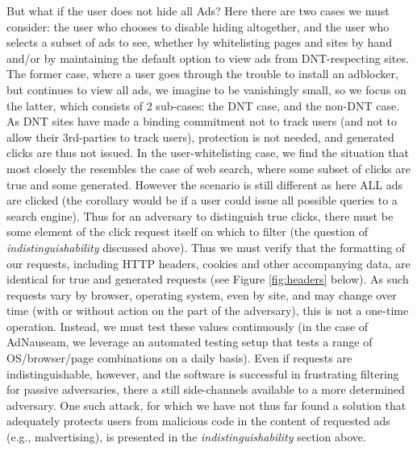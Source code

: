 \documentclass[conference]{IEEEtran}
\begin{document}
But what if the user does not hide all Ads? Here there are two cases we must consider: the user who chooses to disable hiding altogether, and the user who selects a subset of ads to see, whether by whitelisting pages and sites by hand and/or by maintaining the default option to view ads from DNT-respecting sites. The former case, where a user goes through the trouble to install an adblocker, but continues to view all ads, we imagine to be vanishingly small, so we focus on the latter, which consists of 2 sub-cases: the DNT case, and the non-DNT case. As DNT sites have made a binding commitment not to track users (and not to allow their 3rd-parties to track users), protection is not needed, and generated clicks are thus not issued. In the user-whitelisting case, we find the situation that most closely the resembles the case of web search, where some subset of clicks are true and some generated. However the scenario is still different as here ALL ads are clicked (the corollary would be if a user could issue all possible queries to a search engine). Thus for an adversary to distinguish true clicks, there must be some element of the click request itself on which to filter (the question of \emph{indistinguishability} discussed above). Thus we must verify that the formatting of our requests, including HTTP headers, cookies and other accompanying data, are identical for true and generated requests (see Figure \ref{fig:headers} below). As such requests vary by browser, operating system, even by site, and may change over time (with or without action on the part of the adversary), this is not a one-time operation. Instead, we must test these values continuously (in the case of AdNauseam, we leverage an automated testing setup that tests a range of OS/browser/page combinations on a daily basis). Even if requests are indistinguishable, however, and the software is successful in frustrating filtering for passive adversaries, there a still side-channels available to a more determined adversary. One such attack, for which we have not thus far found a solution that adequately protects users from malicious code in the content of requested ads (e.g., malvertising), is presented in the \emph{indistinguishability} section above.

%
\end{document}
